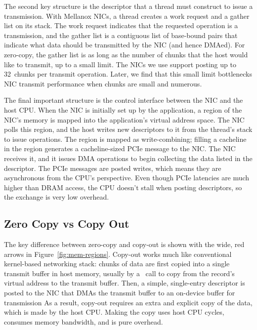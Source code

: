 The second key structure is the descriptor that a thread must construct to
issue a transmission. With Mellanox NICs, a thread creates a work request and a
gather list on its stack. The work request indicates that the requested
operation is a transmission, and the gather list is a contiguous list of
base-bound pairs that indicate what data should be transmitted by the NIC (and
hence DMAed). For zero-copy, the gather list is as long as the number of chunks
that the host would like to transmit, up to a small limit. The NICs we use support
posting up to 32~chunks per transmit operation. Later, we find that this small
limit bottlenecks NIC transmit performance when chunks are small and numerous.

The final important structure is the control interface between the NIC and the
host CPU.  When the NIC is initially set up by the application, a region of the
NIC's memory is mapped into the application's virtual address space. The NIC
polls this region, and the host writes new descriptors to it from the thread's
stack to issue operations. The region is mapped as write-combining; filling a
cacheline in the region generates a cacheline-sized PCIe message to the NIC.
The NIC receives it, and it issues DMA operations to begin collecting the data
listed in the descriptor. The PCIe messages are posted writes, which means they
are asynchronous from the CPU's perspective. Even though PCIe latencies are much
higher than DRAM access, the CPU doesn't stall when posting descriptors, so the
exchange is very low overhead.

\subsection{Zero Copy vs Copy Out}
The key difference between zero-copy and copy-out is shown with the wide, red
arrows in Figure~\ref{fig:mem-regions}. Copy-out works much like conventional
kernel-based networking stack: chunks of data are first copied into a single
transmit buffer in host memory, usually by a \memcpy ~call to copy from the record's 
virtual address to the transmit buffer. Then, a simple, single-entry descriptor is
posted to the NIC that DMAs the transmit buffer to an on-device buffer for transmission
As a result, copy-out requires an extra and explicit copy of the data, which is made
by the host CPU.  Making the copy uses host CPU cycles, consumes memory
bandwidth, and is pure overhead. 




